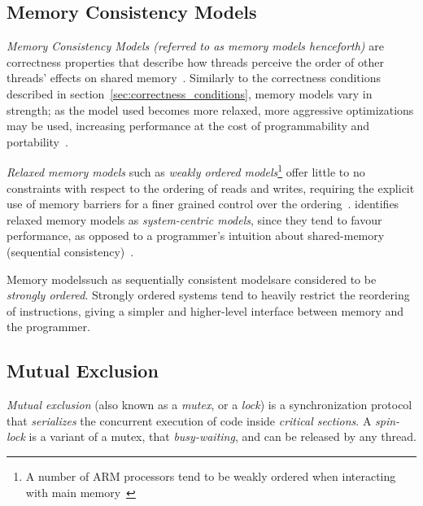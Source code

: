 \subsection{Memory Consistency Models}
\emph{Memory Consistency Models (referred to as memory models henceforth)} are correctness properties that describe how
threads perceive the order of other threads' effects on shared
memory~\citep[Section~3.7]{herlihy2020art}. Similarly to the correctness
conditions described in section~\ref{sec:correctness_conditions}, memory
models vary in strength; as the model used becomes more relaxed, more aggressive
optimizations may be used, increasing performance at the cost of
programmability and portability~\citep{gharachorloo1996consistency}.

\emph{Relaxed memory models} such as \emph{weakly ordered models}\footnote{A number of ARM processors tend to be weakly ordered when interacting with main memory~\citep[Section~A3.5.5]{arm2022architecture}} offer little to no
constraints with respect to the ordering of reads and writes, requiring the
explicit use of memory barriers for a finer grained control over the ordering~\citep{gharachorloo1996consistency}. \citeauthor{gharachorloo1996consistency} identifies relaxed
memory models as \emph{system-centric models}, since they tend to favour
performance, as opposed to a programmer's intuition about shared-memory
(sequential consistency)~\citep{gharachorloo1996consistency}.

Memory models\textemdash such as sequentially consistent models\textemdash are considered to be
\emph{strongly ordered}. Strongly ordered systems tend to
heavily restrict the reordering of instructions, giving a simpler and
higher-level interface between memory and the programmer. 

\subsection{Mutual Exclusion}
\emph{Mutual exclusion} (also known as a \emph{mutex}, or a \emph{lock}) is a
synchronization protocol that \emph{serializes} the concurrent execution of
code inside \emph{critical sections}. A \emph{spin-lock} is a variant of a
mutex, that \emph{busy-waiting}, and can be released by any thread.

